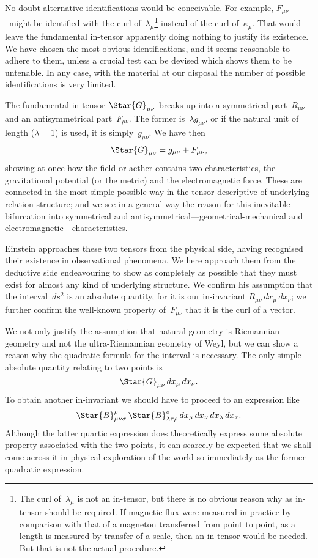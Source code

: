 \documentclass[12pt]{book}
\begin{document}
No doubt alternative identifications would be conceivable. For example,
$F_{\mu\nu}$~might be identified with the curl of~$\lambda_{\mu}$\footnote
  {The curl of~$\lambda_{\mu}$ is not an in\hyp{}tensor, but there is no obvious reason why as in\hyp{}tensor should
  be required. If magnetic flux were measured in practice by comparison with that of a magneton
  transferred from point to point, as a length is measured by transfer of a scale, then an in\hyp{}tensor
  would be needed. But that is not the actual procedure.}
instead of the curl of~$\kappa_{\mu}$. That
would leave the fundamental in\hyp{}tensor apparently doing nothing to justify its
existence. We have chosen the most obvious identifications, and it seems
reasonable to adhere to them, unless a crucial test can be devised which shows
them to be untenable. In any case, with the material at our disposal the
number of possible identifications is very limited.

%

The fundamental in\hyp{}tensor~$\Star{G}_{\mu\nu}$ breaks up into a symmetrical part~$R_{\mu\nu}$
and an antisymmetrical part~$F_{\mu\nu}$. The former is~$\lambda g_{\mu\nu}$, or if the natural unit
of length ($\lambda = 1$) is used, it is simply~$g_{\mu\nu}$. We have then
\[
\Star{G}_{\mu\nu} = g_{\mu\nu} + F_{\mu\nu},
\]
showing at once how the field or aether contains two characteristics, the
%
gravitational potential (or the metric) and the electromagnetic force. These
are connected in the most simple possible way in the tensor descriptive of
underlying relation\hyp{}structure; and we see in a general way the reason for this
%
inevitable bifurcation into symmetrical and antisymmetrical---geometrical\hyp{}mechanical
and electromagnetic---characteristics.

Einstein approaches these two tensors from the physical side, having
recognised their existence in observational phenomena. We here approach
them from the deductive side endeavouring to show as completely as possible
that they must exist for almost any kind of underlying structure. We confirm
his assumption that the interval~$ds^{2}$ is an absolute quantity, for it is our in\hyp{}invariant
$R_{\mu\nu}\, dx_{\mu}\, dx_{\nu}$; we further confirm the well\hyp{}known property of~$F_{\mu\nu}$ that
it is the curl of a vector.

We not only justify the assumption that natural geometry is Riemannian
geometry and not the ultra\hyp{}Riemannian geometry of Weyl, but we can show
a reason why the quadratic formula for the interval is necessary. The only
simple absolute quantity relating to two points is
\[
\Star{G}_{\mu\nu}\, dx_{\mu}\, dx_{\nu}.
\]
To obtain another in\hyp{}invariant we should have to proceed to an expression like
\[
\Star{B}_{\mu\nu\sigma}^{\rho}\, \Star{B}_{\lambda\tau\rho}^{\sigma}\, dx_{\mu}\, dx_{\nu}\, dx_{\lambda}\, dx_{\tau}.
\]
Although the latter quartic expression does theoretically express some absolute
property associated with the two points, it can scarcely be expected that
we shall come across it in physical exploration of the world so immediately as
the former quadratic expression.
\end{document}
